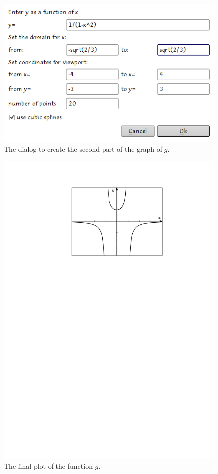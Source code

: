 \documentclass{article}
\begin{document}
\begin{figure}[h]
   \begin{center}
      \includegraphics[scale=.5]{asym2.png}
   \end{center}
   \caption{The dialog to create the second part of the graph of $g$.}
   \label{fig:asym2}
\end{figure}
\begin{figure}[h]
   \begin{center}
      \includegraphics[scale=.7]{asym.pdf}
   \end{center}
   \caption{The final plot of the function $g$.}
   \label{fig:asym_plot}
\end{figure}
\clearpage
\end{document}

